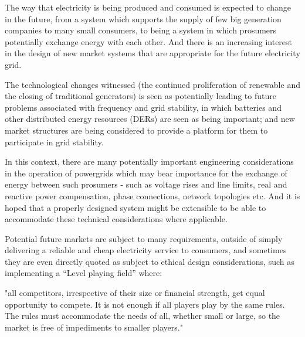 




The way that electricity is being produced and consumed is expected to change in the future, from a system which supports the supply of few big generation companies to many small consumers, to being a system in which prosumers potentially exchange energy with each other.
And there is an increasing interest in the design of new market systems that are appropriate for the future electricity grid.

The technological changes witnessed (the continued proliferation of renewable and the closing of traditional generators) is seen as potentially leading to future problems associated with frequency and grid stability, in which batteries and other distributed energy resources (DERs) are seen as being important; and new market structures are being considered to provide a platform for them to participate in grid stability.

In this context, there are many potentially important engineering considerations in the operation of powergrids which may bear importance for the exchange of energy between such prosumers - such as voltage rises and line limits, real and reactive power compensation, phase connections, network topologies etc.
And it is hoped that a properly designed system might be extensible to be able to accommodate these technical considerations where applicable.

Potential future markets are subject to many requirements, outside of simply delivering a reliable and cheap electricity service to consumers, and sometimes they are even directly quoted as subject to ethical design considerations, such as implementing a ``Level playing field'' where:

"all competitors, irrespective of their size or financial strength, get equal opportunity to compete. It is not enough if all players play by the same rules. The rules must accommodate the needs of all, whether small or large, so the market is free of impediments to smaller players." \cite{australianenergymarketoperatorlimited2018}

